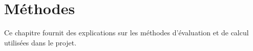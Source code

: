 \chapter{Méthodes}

Ce chapitre fournit des explications sur les méthodes d'évaluation et de calcul utilisées dans le projet.






